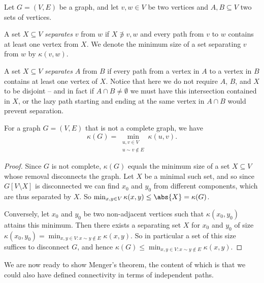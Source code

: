 \documentclass[nobib]{tufte-handout}
\begin{document}
\begin{definition}
  Let $G = (V,E)$ be a graph, and let $v, w \in V$ be two vertices and $A, B \subseteq V$ two sets of vertices.

  A set $X \subseteq V$ \emph{separates} $v$ from $w$ if $X \not\ni v, w$ and every path from $v$ to $w$ contains at least one vertex from $X$. We denote the minimum size of a set separating $v$ from $w$ by $\kappa(v,w)$.

  A set $X \subseteq V$ \emph{separates} $A$ from $B$ if every path from a vertex in $A$ to a vertex in $B$ contains at least one vertex of $X$. Notice that here we do not require $A$, $B$, and $X$ to be disjoint -- and in fact if $A\cap B\neq \emptyset$ we must have this intersection contained in $X$, or the lazy path starting and ending at the same vertex in $A\cap B$ would prevent separation.
\end{definition}

\begin{lemma}
  For a graph $G = (V,E)$ that is not a complete graph, we have
  $$\kappa(G) = \min_{\substack{u, v \in V\\u\sim v \not\in E}} \kappa(u,v).$$

  \begin{proof}
    Since $G$ is not complete, $\kappa(G)$ equals the minimum size of a set $X \subseteq V$ whose removal disconnects the graph. Let $X$ be a minimal such set, and so since $G[V \setminus X]$ is disconnected we can find $x_0$ and $y_0$ from different components, which are thus separated by $X$. So $\min_{x,y \in V} \kappa(x,y) \leq \abs{X} = \kappa(G)$.

    Conversely, let $x_0$ and $y_0$ be two non-adjacent vertices such that $\kappa(x_0, y_0)$ attains this minimum. Then there exists a separating set $X$ for $x_0$ and $y_0$ of size $\kappa(x_0, y_0) = \min_{x,y \in V: x\sim y \not\in E} \kappa(x, y)$. So in particular a set of this size suffices to disconnect $G$, and hence $\kappa(G) \leq \min_{x,y \in V: x\sim y \not\in E} \kappa(x, y)$.
  \end{proof}
\end{lemma}

We are now ready to show Menger's theorem, the content of which is that we could also have defined connectivity in terms of independent paths.
\end{document}
